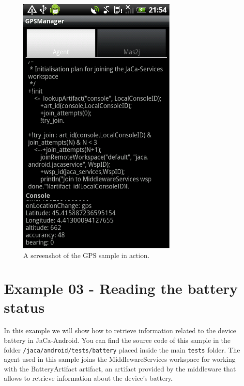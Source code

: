 \documentclass[11pt]{report}
\newcommand\code[1]{{\mbox{\texttt{{#1}}}}}
\newcommand{\jacandroid}{\textsf{JaCa-Android}}
\begin{document}
\clearpage
\begin{figure}[!h]
\begin{center}
\includegraphics[width=8cm]{images/test_gps_gui.png}
\end{center}
\caption{A screenshot of the GPS sample in action.}
\end{figure}


\section{Example 03 - Reading the battery status}

In this example we will show how to retrieve information related to the device battery in \jacandroid{}. You can find the source code of this sample in the folder \code{/jaca/android/tests/battery} placed inside the main \code{tests} folder. The agent used in this sample joins the \textsf{MiddlewareServices} workspace for working with the \textsf{BatteryArtifact} artifact, an artifact provided by the middleware that allows to retrieve information about the device's battery. 
\end{document}
